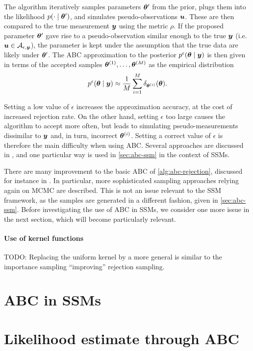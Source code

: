 The algorithm iteratively samples parameters $\bm{\theta}^\prime$ from the prior, plugs them into the likelihood $p(\cdot \mid \bm{\theta}^\prime)$, and simulates pseudo-observations $\bm{u}$. These are then compared to the true measurement $\bm{y}$ using the metric $\rho$. If the proposed parameter $\bm{\theta}^\prime$ gave rise to a pseudo-observation similar enough to the true $\bm{y}$ (i.e. $\bm{u} \in \mathcal{A}_{\epsilon, \bm{y}}$), the parameter is kept under the assumption that the true data are likely under $\bm{\theta}^\prime$. The ABC approximation to the posterior $p^\epsilon(\bm{\theta} \mid \bm{y})$ is then given in terms of the accepted samples $\bm{\theta}^{(1)}, \ldots, \bm{\theta}^{(M)}$ as the empirical distribution
\begin{equation*}
p^\epsilon(\bm{\theta} \mid \bm{y}) \approx \frac{1}{M} \sum_{i=1}^M \delta_{\bm{\theta}^{(i)}}(\bm{\theta}).
\end{equation*}

Setting a low value of $\epsilon$ increases the approximation accuracy, at the cost of increased rejection rate. On the other hand, setting $\epsilon$ too large causes the algorithm to accept more often, but leads to simulating pseudo-measurements dissimilar to $\bm{y}$ and, in turn, incorrect $\bm{\theta}^{(i)}$. Setting a correct value of $\epsilon$ is therefore the main difficulty when using ABC. Several approaches are discussed in \cite{jasra-filtering, jasra-time-series}, and one particular way \citep{dedecius} is used in \autoref{sec:abc-ssm} in the context of SSMs.

There are many improvement to the basic ABC of \autoref{alg:abc-rejection}, discussed for instance in \cite{abc-recent}. In particular, more sophisticated sampling approaches relying again on MCMC are described. This is not an issue relevant to the SSM framework, as the samples are generated in a different fashion, given in \autoref{sec:abc-ssm}. Before investigating the use of ABC in SSMs, we consider one more issue in the next section, which will become particularly relevant.

\paragraph{Use of kernel functions}


{\color{red} TODO: Replacing the uniform kernel by a more general is similar to the importance sampling ``improving'' rejection sampling.}

\section{ABC in SSMs} \label{sec:abc-ssm}


\section{Likelihood estimate through ABC} \label{sec:abcmh}